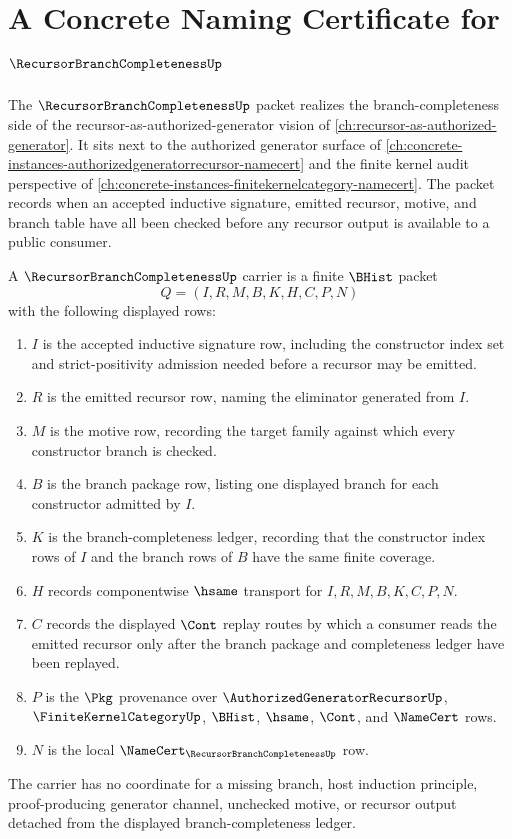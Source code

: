\chapter{A Concrete Naming Certificate for $\RecursorBranchCompletenessUp$}
\label{ch:concrete-instances-recursorbranchcompleteness-namecert}

The $\RecursorBranchCompletenessUp$ packet realizes the branch-completeness side of the recursor-as-authorized-generator vision of \autoref{ch:recursor-as-authorized-generator}. It sits next to the authorized generator surface of \autoref{ch:concrete-instances-authorizedgeneratorrecursor-namecert} and the finite kernel audit perspective of \autoref{ch:concrete-instances-finitekernelcategory-namecert}. The packet records when an accepted inductive signature, emitted recursor, motive, and branch table have all been checked before any recursor output is available to a public consumer.

\begin{definition}
\label{def:recursor-branch-completeness-carrier}
A $\RecursorBranchCompletenessUp$ carrier is a finite $\BHist$ packet
$$
Q=(I,R,M,B,K,H,C,P,N)
$$
with the following displayed rows:
\begin{enumerate}
\item $I$ is the accepted inductive signature row, including the constructor index set and strict-positivity admission needed before a recursor may be emitted.
\item $R$ is the emitted recursor row, naming the eliminator generated from $I$.
\item $M$ is the motive row, recording the target family against which every constructor branch is checked.
\item $B$ is the branch package row, listing one displayed branch for each constructor admitted by $I$.
\item $K$ is the branch-completeness ledger, recording that the constructor index rows of $I$ and the branch rows of $B$ have the same finite coverage.
\item $H$ records componentwise $\hsame$ transport for $I,R,M,B,K,C,P,N$.
\item $C$ records the displayed $\Cont$ replay routes by which a consumer reads the emitted recursor only after the branch package and completeness ledger have been replayed.
\item $P$ is the $\Pkg$ provenance over $\AuthorizedGeneratorRecursorUp$, $\FiniteKernelCategoryUp$, $\BHist$, $\hsame$, $\Cont$, and $\NameCert$ rows.
\item $N$ is the local $\NameCert_{\RecursorBranchCompletenessUp}$ row.
\end{enumerate}
The carrier has no coordinate for a missing branch, host induction principle, proof-producing generator channel, unchecked motive, or recursor output detached from the displayed branch-completeness ledger.
\end{definition}

